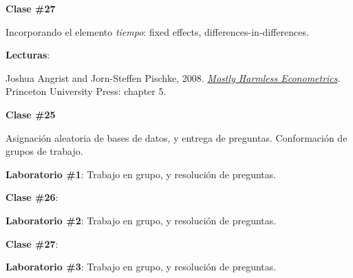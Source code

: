 \documentclass[letterpaper]{article}
\renewenvironment{itemize}{
  \begin{list}{}{
    \setlength{\leftmargin}{1.5em}
  }
}{
  \end{list}
}
\begin{document}
\begin{enumerate}
      \begin{itemize} 
        \item[$\bullet$] {\bf Clase \#27}
          \begin{itemize} 
            \item[$\circ$] Incorporando el elemento \emph{tiempo}: fixed effects, differences-in-differences.
            \item[$\circ$] {\bf Lecturas}: 
              \begin{itemize}
                \item[$\diamond$] Joshua Angrist and Jorn-Steffen Pischke, 2008. \href{https://github.com/hbahamonde/Metodos_Cuanti_I/raw/master/Readings/MHE.pdf}{\emph{Mostly Harmless Econometrics}}. Princeton University Press: chapter 5.
              \end{itemize}
          \end{itemize}
      \end{itemize}


			\begin{itemize} 
				\item[$\bullet$] {\bf Clase \#25}
					\begin{itemize} 
						\item[$\circ$] Asignaci\'on aleatoria de bases de datos, y entrega de preguntas. Conformaci\'on de grupos de trabajo.
						\item[$\circ$] {\bf Laboratorio \#1}: Trabajo en grupo, y resoluci\'on de preguntas.
					\end{itemize}
			\end{itemize}


			\begin{itemize} 
				\item[$\bullet$] {\bf Clase \#26}:
					\begin{itemize} 
						\item[$\circ$] {\bf Laboratorio \#2}: Trabajo en grupo, y resoluci\'on de preguntas.
					\end{itemize}
			\end{itemize}


			\begin{itemize} 
				\item[$\bullet$] {\bf Clase \#27}:
					\begin{itemize} 
						\item[$\circ$] {\bf Laboratorio \#3}: Trabajo en grupo, y resoluci\'on de preguntas.
					\end{itemize}
			\end{itemize}




\end{enumerate}
\end{document}
